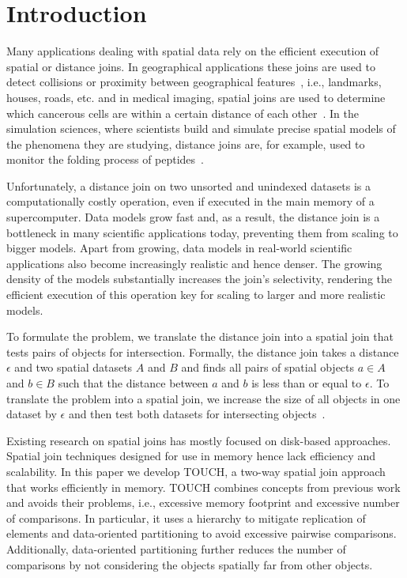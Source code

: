 \documentclass{vldb}
\begin{document}
\vspace{-3mm}
\vspace{-2mm}
\vspace{-2mm}
\section{Introduction}
Many applications dealing with spatial data rely on the efficient execution of spatial or distance joins. In geographical applications these joins are used to
detect collisions or proximity between geographical features~\cite{gis}, i.e., landmarks, houses, roads, etc. and in medical imaging, spatial joins are used to
determine which cancerous cells are within a certain distance of each other~\cite{pais}. In the simulation sciences, where scientists build and simulate precise
spatial models of the phenomena they are studying, distance joins are, for example, used to monitor the folding process of peptides~\cite{peptidefolding}.

Unfortunately, a distance join on two unsorted and unindexed datasets is a computationally costly operation, even if executed in the main memory of a
supercomputer. Data models grow fast and, as a result, the distance join is a bottleneck in many scientific applications today, preventing them from scaling to
bigger models. Apart from growing, data models in real-world scientific applications also become increasingly realistic and hence denser. The growing density of
the models substantially increases the join's selectivity, rendering the efficient execution of this operation key for scaling to larger and more realistic models.

To formulate the problem, we translate the distance join into a spatial join that tests pairs of objects for intersection. Formally, the distance join takes a
distance $\epsilon$ and two spatial datasets $A$ and $B$ and finds all pairs of spatial objects $a \in A$ and $b \in B$ such that the distance between $a$ and
$b$ is less than or equal to $\epsilon$. To translate the problem into a spatial join, we increase the size of all objects in one dataset by $\epsilon$
and then test both datasets for intersecting objects~\cite{spatialjointechniques}.

Existing research on spatial joins has mostly focused on disk-based approaches. Spatial join techniques designed for use in memory hence lack efficiency and
scalability. In this paper we develop TOUCH, a two-way spatial join approach that works efficiently in memory. TOUCH combines concepts from previous work
and avoids their problems, i.e., excessive memory footprint and excessive number of comparisons. In particular, it uses a hierarchy to mitigate replication of
elements and data-oriented partitioning to avoid excessive pairwise comparisons. Additionally, data-oriented partitioning further reduces the number of
comparisons by not considering the objects spatially far from other objects.
\end{document}
